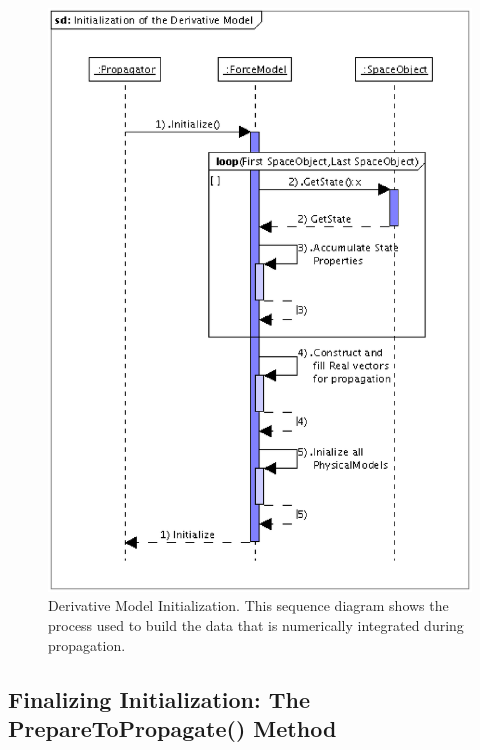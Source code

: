 \begin{figure}[htb]
\begin{center}
\includegraphics[scale=0.5]{Images/InitializationoftheDerivativeModel.eps}
\caption[Derivative Model Initialization]{\label{figure:DerivativeModelInitialization}Derivative
Model Initialization.  This sequence diagram shows the process used to build the data that is
numerically integrated during propagation.}
\end{center}
\end{figure}


\subsection{Finalizing Initialization: The PrepareToPropagate() Method}

